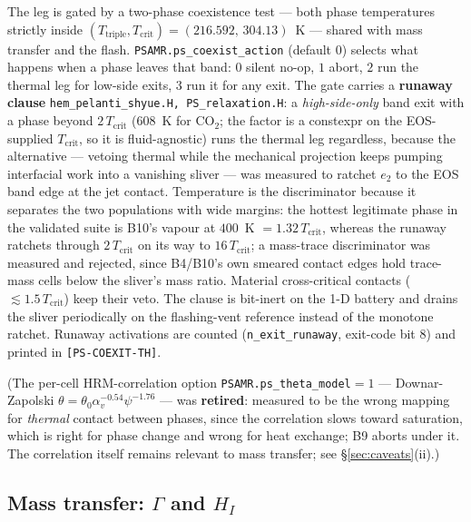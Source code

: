 \documentclass[11pt,a4paper]{article}
\newcommand{\code}[1]{\texttt{\small #1}}
\newcommand{\src}[1]{{\color{gray}\code{#1}}}
\begin{document}
The leg is gated by a two-phase coexistence test --- both phase temperatures
strictly inside $(T_{\mathrm{triple}},T_{\mathrm{crit}}) = (216.592,\,304.13)$~K
--- shared with mass transfer and the flash.  \code{PSAMR.ps\_coexist\_action}
(default $0$) selects what happens when a phase leaves that band: $0$ silent
no-op, $1$ abort, $2$ run the thermal leg for low-side exits, $3$ run it for
any exit.  The gate carries a \textbf{runaway clause}
\src{hem\_pelanti\_shyue.H, PS\_relaxation.H}: a \emph{high-side-only}
band exit with a phase beyond $2\,T_{\mathrm{crit}}$ ($608$~K for CO$_2$; the
factor is a constexpr on the EOS-supplied $T_{\mathrm{crit}}$, so it is
fluid-agnostic) runs the thermal leg regardless, because the alternative ---
vetoing thermal while the mechanical projection keeps pumping interfacial
work into a vanishing sliver --- was measured to ratchet $e_2$ to the EOS band
edge at the jet contact.  Temperature is the discriminator because it
separates the two populations with wide margins: the hottest legitimate phase
in the validated suite is B10's vapour at $400$~K $=1.32\,T_{\mathrm{crit}}$,
whereas the runaway ratchets through $2\,T_{\mathrm{crit}}$ on its way to
$16\,T_{\mathrm{crit}}$; a mass-trace discriminator was measured and rejected,
since B4/B10's own smeared contact edges hold trace-mass cells below the
sliver's mass ratio.  Material cross-critical contacts
($\lesssim1.5\,T_{\mathrm{crit}}$) keep their veto.  The clause is
bit-inert on the 1-D battery and drains the sliver periodically on the
flashing-vent reference instead of the monotone ratchet.  Runaway activations
are counted (\code{n\_exit\_runaway}, exit-code bit 8) and printed in
\code{[PS-COEXIT-TH]}.

(The per-cell HRM-correlation option \code{PSAMR.ps\_theta\_model}$=1$ ---
Downar-Zapolski $\theta=\theta_0\alpha_v^{-0.54}\psi^{-1.76}$ --- was
\textbf{retired}: measured to be the wrong mapping for
\emph{thermal} contact between phases, since the correlation slows toward
saturation, which is right for phase change and wrong for heat exchange;
B9 aborts under it.  The correlation itself remains relevant to mass
transfer; see \S\ref{sec:caveats}(ii).)

\subsection{Mass transfer: $\Gamma$ and $H_{\!I}$}
\end{document}
